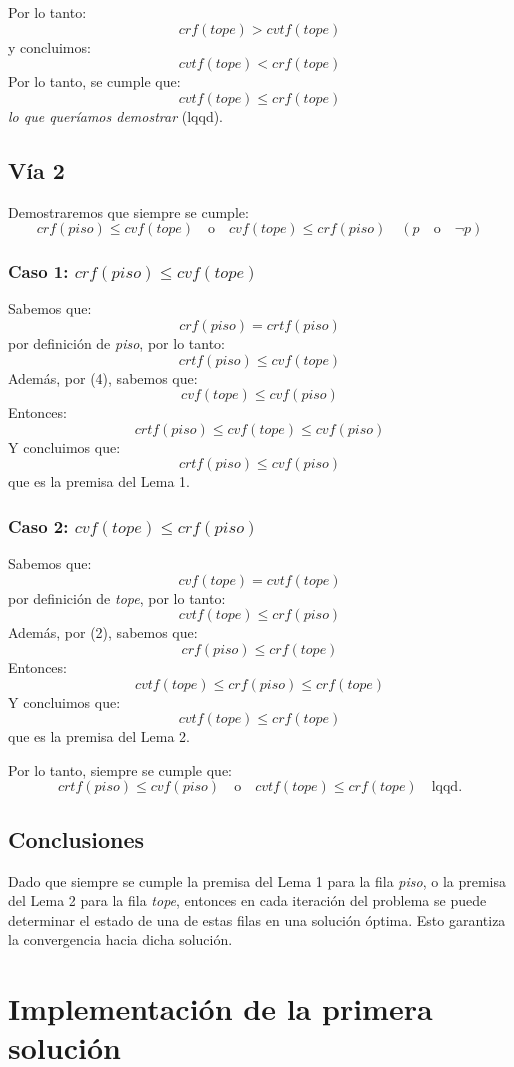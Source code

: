 \documentclass[a4paper,12pt]{article}
\begin{document}
Por lo tanto:
\[
crf(tope) > cvtf(tope)
\]
y concluimos:
\[
cvtf(tope) < crf(tope)
\]
Por lo tanto, se cumple que:
\[
cvtf(tope) \leq crf(tope)
\]
\textit{lo que queríamos demostrar} (lqqd).
\subsection{Vía 2}

Demostraremos que siempre se cumple:
\[
crf(piso) \leq cvf(tope) \quad \text{o} \quad cvf(tope) \leq crf(piso) \quad (p \quad \text{o} \quad \neg p)
\]

\subsubsection{Caso 1: $crf(piso) \leq cvf(tope)$}

Sabemos que:
\[
crf(piso) = crtf(piso)
\]
por definición de \textit{piso}, por lo tanto:
\[
crtf(piso) \leq cvf(tope)
\]
Además, por (4), sabemos que:
\[
cvf(tope) \leq cvf(piso)
\]
Entonces:
\[
crtf(piso) \leq cvf(tope) \leq cvf(piso)
\]
Y concluimos que:
\[
crtf(piso) \leq cvf(piso)
\]
que es la premisa del Lema 1.

\subsubsection{Caso 2: $cvf(tope) \leq crf(piso)$}

Sabemos que:
\[
cvf(tope) = cvtf(tope)
\]
por definición de \textit{tope}, por lo tanto:
\[
cvtf(tope) \leq crf(piso)
\]
Además, por (2), sabemos que:
\[
crf(piso) \leq crf(tope)
\]
Entonces:
\[
cvtf(tope) \leq crf(piso) \leq crf(tope)
\]
Y concluimos que:
\[
cvtf(tope) \leq crf(tope)
\]
que es la premisa del Lema 2.

Por lo tanto, siempre se cumple que:
\[
crtf(piso) \leq cvf(piso) \quad \text{o} \quad cvtf(tope) \leq crf(tope) \quad \text{lqqd}.
\]

\subsection{Conclusiones}
Dado que siempre se cumple la premisa del Lema 1 para la fila \textit{piso}, o la premisa del Lema 2 para la fila \textit{tope}, entonces en cada iteración del problema se puede determinar el estado de una de estas filas en una solución óptima. Esto garantiza la convergencia hacia dicha solución.

\section{Implementación de la primera solución}
\end{document}
